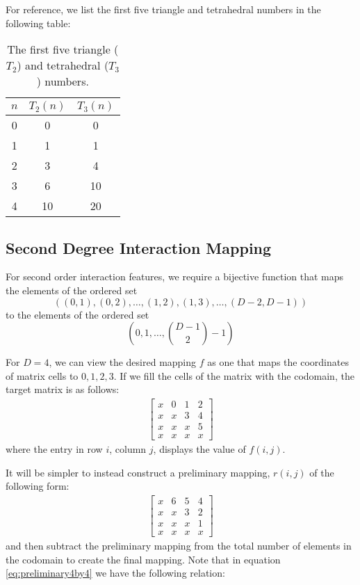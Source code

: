 \documentclass[journal]{journal}
\begin{document}
For reference, we list the first five triangle and tetrahedral numbers in the following table:
\begin{table}
  \centering
  \caption{The first five triangle ($T_2$) and tetrahedral ($T_3$) numbers.}
  \begin{tabular}{| c | c | c |}
    \hline
    $n$ & $T_2(n)$ & $T_3(n)$ \\
    \hline
    0 & 0 & 0 \\
    1 & 1 & 1 \\
    2 & 3 & 4 \\
    3 & 6 & 10 \\
    4 & 10 & 20 \\
    \hline  
  \end{tabular}
\end{table}

\subsection{Second Degree Interaction Mapping}
For second order interaction features, we require a bijective function that maps the elements of the ordered set
\begin{equation}
((0, 1), (0, 2), \dots, (1, 2), (1, 3), \dots, (D-2, D-1))
\end{equation}
to the elements of the ordered set
\begin{equation}
(0,1,\dots,\binom{D-1}{2}-1)
\end{equation}

For $D=4$, we can view the desired mapping $f$ as one that maps the coordinates of matrix cells to $0, 1, 2, 3$.
If we fill the cells of the matrix with the codomain, the target matrix is as follows:
\begin{align}
\begin{bmatrix}
x & 0 & 1 & 2 \\
x & x & 3 & 4 \\
x & x & x & 5 \\
x & x & x & x
\end{bmatrix}
\label{eq:4by4mat}
\end{align}
where the entry in row $i$, column $j$, displays the value of $f(i, j)$.

It will be simpler to instead construct a preliminary mapping, $r(i, j)$ of the following form:
\begin{align}
\begin{bmatrix}
x & 6 & 5 & 4 \\
x & x & 3 & 2 \\
x & x & x & 1 \\
x & x & x & x
\end{bmatrix}
\label{eq:preliminary4by4}
\end{align}
and then subtract the preliminary mapping from the total number of elements in the codomain to create the final mapping.
Note that in equation \ref{eq:preliminary4by4} we have the following relation:
\end{document}
